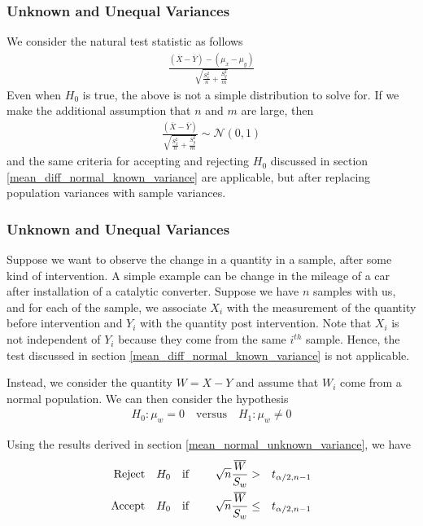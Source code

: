 \documentclass[../probability-notes.tex]{subfiles}
\begin{document}
    \subsubsection{Unknown and Unequal Variances}
    We consider the natural test statistic as follows
    \begin{align*}
        \frac{(\overline{X} - \overline{Y}) - (\mu_{x} - \mu_{y})}{\sqrt{\frac{S_{x}^{2}}{n} + \frac{S_{y}^{2}}{m}}}
    \end{align*}
    Even when $H_{0}$ is true, the above is not a simple distribution to solve for. If we make the additional assumption that $n$ and $m$ are large, then
    \begin{align*}
        \frac{(\overline{X} - \overline{Y})}{\sqrt{\frac{S_{x}^{2}}{n} + \frac{S_{y}^{2}}{m}}} \sim \mathcal{N}(0, 1)
    \end{align*}
    and the same criteria for accepting and rejecting $H_{0}$ discussed in section \ref{mean_diff_normal_known_variance} are applicable, but after replacing population variances with sample variances.\newline


    \subsubsection{Unknown and Unequal Variances}
    Suppose we want to observe the change in a quantity in a sample, after some kind of intervention. A simple example can be change in the mileage of a car after installation of a catalytic converter. Suppose we have $n$ samples with us, and for each of the sample, we associate $X_{i}$ with the measurement of the quantity before intervention and $Y_{i}$ with the quantity post intervention. Note that $X_{i}$ is not independent of $Y_{i}$ because they come from the same $i^{th}$ sample. Hence, the test discussed in section \ref{mean_diff_normal_known_variance} is not applicable.\newline

    Instead, we consider the quantity $W = X - Y$ and assume that $W_{i}$ come from a normal population. We can then consider the hypothesis
    \begin{align*}
        H_{0}: \mu_{w} = 0 \quad \text{versus} \quad H_{1}: \mu_{w} \neq 0
    \end{align*}

    Using the results derived in section \ref{mean_normal_unknown_variance}, we have
    \begin{alignat*}{4}
        \text{Reject\quad} &H_{0} \text{\quad if \quad} &\sqrt{n}\frac{\overline{W}}{S_{w}} &> &t_{\alpha/2, n-1}\\
        \text{Accept\quad} &H_{0} \text{\quad if\quad} &\sqrt{n}\frac{\overline{W}}{S_{w}} &\leq &t_{\alpha/2, n-1}
    \end{alignat*}
\end{document}
